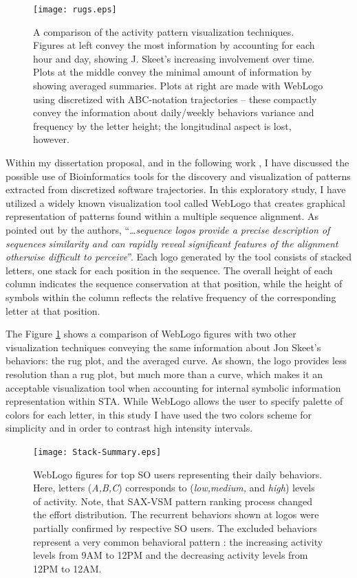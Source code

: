 \begin{figure}[t]
   \centering
   \texttt{[image: rugs.eps]}
   \caption{A comparison of the activity pattern visualization techniques. Figures at left convey the most information by accounting for each hour and day, showing J. Skeet's increasing involvement over time. Plots at the middle convey the minimal amount of information by showing averaged summaries. Plots at right are made with WebLogo \cite{weblogo} using discretized with ABC-notation trajectories -- these compactly convey the information about daily/weekly behaviors variance and frequency by the letter height; the longitudinal aspect is lost, however.}
   \label{fig:rugs}   
\end{figure}

Within my dissertation proposal, and in the following work \cite{csdl2-10-09}, I have discussed the possible use of Bioinformatics tools for the discovery and visualization of patterns extracted from discretized software trajectories. In this exploratory study, I have utilized a widely known visualization tool called WebLogo \cite{weblogo} that creates graphical representation of patterns found within a multiple sequence alignment. As pointed out by the authors, ``\dots \textit{sequence logos provide a precise description of sequences similarity and can rapidly reveal significant features of the alignment otherwise difficult to perceive}''. Each logo generated by the tool consists of stacked letters, one stack for each position in the sequence. The overall height of each column indicates the sequence conservation at that position, while the height of symbols within the column reflects the relative frequency of the corresponding letter at that position.

The Figure \ref{fig:rugs} shows a comparison of WebLogo figures with two other visualization techniques conveying the same information about Jon Skeet's behaviors: the rug plot, and the averaged curve. As shown, the logo provides less resolution than a rug plot, but much more than a curve, which makes it an acceptable visualization tool when accounting for internal symbolic information representation within STA. While WebLogo allows the user to specify palette of colors for each letter, in this study I have used the two colors scheme for simplicity and in order to contrast high intensity intervals. 

\begin{figure}[t]
   \centering
   \texttt{[image: Stack-Summary.eps]}
   \caption{WebLogo figures for top SO users representing their daily behaviors. Here, letters (\textit{A,B,C}) corresponds to (\textit{low,medium,} and \textit{high}) levels of activity. Note, that SAX-VSM pattern ranking process changed the effort distribution. 
   The recurrent behaviors shown at logos were partially confirmed by respective SO users. 
   The excluded behaviors represent a very common behavioral pattern \cite{activity_patterns}: 
   the increasing activity levels from 9AM to 12PM and the decreasing activity levels from 12PM to 12AM.}
   \label{fig:stack_daily}   
\end{figure}

